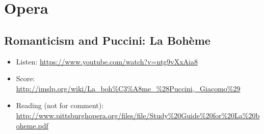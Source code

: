 
\chapter{Opera}
\label{opera}


\section{Romanticism and Puccini: La Boh\`eme}
\begin{itemize}
\item Listen: \url{https://www.youtube.com/watch?v=ntg9vXxAia8}
\item Score: \url{http://imslp.org/wiki/La_boh%C3%A8me_%28Puccini,_Giacomo%29}
\item Reading (not for comment): \url{http://www.pittsburghopera.org/files/file/Study%20Guide%20for%20La%20boheme.pdf}
\end{itemize}

\begin{comment}
\subsection{Post-Beethoven}
What do we have?
More literary and romantic scenes (programmes).
Carl Maria von Weber (1786-1826). Der Freisch\"utz (1821) for which he is best known (though many of his piano works are excellent). The opera has the supernatural, magic and  the devil at its heart. There are elements of surrealism (dream-like fantasy). 

Current literature included Mary Shelley's Frankenstein (1818).  
\url{http://www.gutenberg.org/files/84/84-h/84-h.htm}

 
\end{comment}
